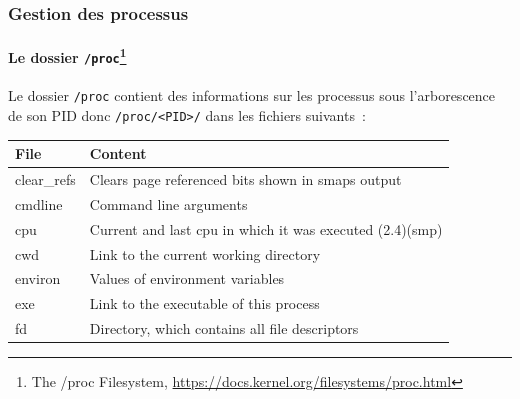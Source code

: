 \documentclass{beamer}
\begin{document}
    \begin{frame}
        \transdissolve
        \frametitle{Gestion des processus}
        \framesubtitle{Le dossier \lstinline{/proc}\footnote{The /proc Filesystem, \url{https://docs.kernel.org/filesystems/proc.html}}}
        \begin{footnotesize}
            Le dossier \lstinline{/proc} contient des informations sur les processus sous l'arborescence de son PID donc \lstinline{/proc/<PID>/} dans les fichiers suivants~:
            \begin{tiny}
                \begin{table}[h!]
                    \centering
                    \begin{tabular}{|p{1.5cm}|p{9cm}|}
                        \hline
                        \textbf{File} & \textbf{Content}                                                                                                            \\
                        \hline
                        clear\_refs   & Clears page referenced bits shown in smaps output                                                                           \\
                        \hline
                        cmdline       & Command line arguments                                                                                                      \\
                        \hline
                        cpu           & Current and last cpu in which it was executed (2.4)(smp)                                                                    \\
                        \hline
                        cwd           & Link to the current working directory                                                                                       \\
                        \hline
                        environ       & Values of environment variables                                                                                             \\
                        \hline
                        exe           & Link to the executable of this process                                                                                      \\
                        \hline
                        fd            & Directory, which contains all file descriptors                                                                              \\

\end{tabular}
\end{table}
\end{tiny}
\end{footnotesize}
\end{frame}
\end{document}
